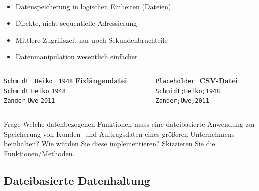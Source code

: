 \begin{frame}{\insertsection}
	\framesubtitle{\insertsubsection}
		\begin{itemize}
			\item Datenspeicherung in logischen Einheiten (Dateien)
			\item Direkte, nicht-sequentielle Adressierung
			\item Mittlere Zugriffszeit nur noch Sekundenbruchteile
			\item Datenmanipulation wesentlich einfacher
		\end{itemize}

	\begin{columns}
		\begin{column}{.48\textwidth}
			\begin{tabbing}
				\texttt{Schmidt   } \= \texttt{Heiko   } \= \texttt{1948} \kill
				\textbf{Fixlängendatei} \> \> \\
				\texttt{Schmidt} \> \texttt{Heiko} \> \texttt{1948} \\
				\texttt{Zander} \> \texttt{Uwe} \> \texttt{2011}
			\end{tabbing}
		\end{column}

		\begin{column}{.48\textwidth}
			\begin{tabbing}
				\texttt{Placeholder} \= \kill
				\textbf{CSV-Datei}\\
				\texttt{Schmidt;Heiko;1948}\\
				\texttt{Zander;Uwe;2011}
			\end{tabbing}
		\end{column}
	\end{columns}

	\onslide\pause 
	\begin{alertblock}{Frage}
	Welche datenbezogenen Funktionen muss eine dateibasierte Anwendung zur Speicherung von Kunden- und 
	Auftragsdaten eines größeren Unternehmens beinhalten? Wie würden Sie diese implementieren? Skizzieren 
	Sie die Funktionen/Methoden.
	\end{alertblock}
	
\end{frame}

\subsection{Dateibasierte Datenhaltung}

